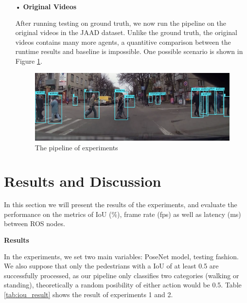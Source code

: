 \begin{itemize}
\item[•] \textbf{Original Videos}

After running testing on ground truth, we now run the pipeline on the original videos in the JAAD dataset. Unlike the ground truth, the original videos contains many more agents, a quantitive comparison between the runtime results and baseline is impossible. One possible scenario is shown in Figure \ref{fig:runtime_demo}. 

\begin{figure}[h!]
  \centering
  \includegraphics[width=0.9\linewidth]{ExpAndDiss/runtime_demo.png}
  \caption{The pipeline of experiments}
  \label{fig:runtime_demo}
\end{figure}

\end{itemize}


\section{Results and Discussion}
\label{sec:eval}

In this section we will present the results of the experiments, and evaluate the performance on the metrics of IoU (\%), frame rate (fps) as well as latency (ms) between ROS nodes. 

\textbf{Results}

In the experiments, we set two main variables: PoseNet model, testing fashion. We also suppose that only the pedestrians with a IoU of at least 0.5 are successfully processed, as our pipeline only classifies two categories (walking or standing), theoretically a random posibility of either action would be 0.5. Table \ref{tab:iou_result} shows the result of experiments 1 and 2.

